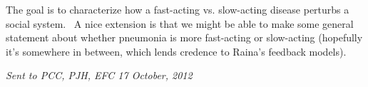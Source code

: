 \documentclass{article}\usepackage{graphicx, color}
\begin{document}
\vspace{.1in}

The goal is to characterize how a fast-acting vs. slow-acting disease perturbs a social system.  A nice extension is that we might be able to make some general statement about whether pneumonia is more fast-acting or slow-acting (hopefully it's somewhere in between, which lends credence to Raina's feedback models).
\vspace{.1in}

\textit{Sent to PCC, PJH, EFC 17 October, 2012}
\end{document}
